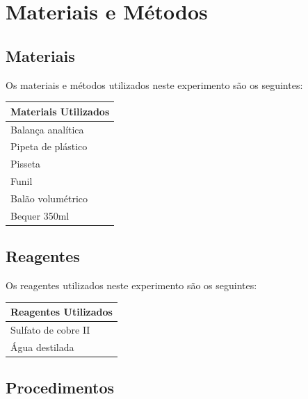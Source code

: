 \documentclass[a4paper, 11pt]{article}
\begin{document}
\section{Materiais e Métodos}\label{sec:materiais_metodos}

    \subsection{Materiais}\label{sec:materiais}

        \indent Os materiais e métodos utilizados neste experimento são os seguintes:

        \begin{center}


            \begin{tabular}{| l |}
                \hline
                \bf Materiais Utilizados \\ \hline
                Balança analítica \\ \hline
                Pipeta de plástico \\ \hline
                Pisseta \\ \hline
                Funil \\ \hline
                Balão volumétrico \\ \hline
                Bequer 350ml \\ \hline
            \end{tabular}
        \end{center}
    \doublespacing
    \subsection{Reagentes}\label{sec:reagentes}

        \indent Os reagentes utilizados neste experimento são os seguintes:

        \begin{center}
            \begin{tabular}{| l |}
                \hline
                \bf Reagentes Utilizados \\ \hline
                Sulfato de cobre II \\ \hline
                Água destilada \\ \hline
            \end{tabular}
        \end{center}
    \doublespacing

    \subsection{Procedimentos}\label{sec:procedimentos}
\end{document}

